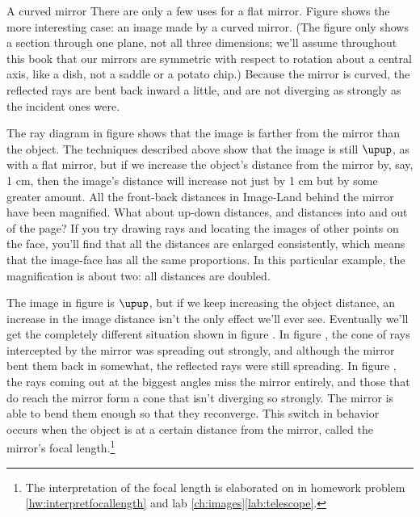 \begin{envsubsection}{A curved mirror}
There are only a few uses for a flat mirror. Figure  shows
the more interesting case: an image made by a curved mirror. (The figure only shows a section through
one plane, not all three dimensions; we'll assume throughout this book that our mirrors are
symmetric with respect to rotation about a central axis, like a dish, not a saddle or a potato chip.)
Because the mirror is curved, the reflected rays are bent back inward a little, and are not
diverging as strongly as the incident ones were.

%
The ray diagram in figure  shows that the image is farther from
the mirror than the object. The techniques described above show that the image is
still $\upup$, as with a flat mirror, but if we increase the object's distance from the
mirror by, say, 1 cm, then the image's distance will increase not just by 1 cm but by
some greater amount. All the front-back distances in Image-Land behind the mirror
have been magnified. What about up-down distances, and distances into and out of the page?
If you try drawing rays and locating the images of other points on the face, you'll find that
all the distances are enlarged consistently, which means that the image-face has all the same
proportions. In this particular example, the magnification is about two: all distances are
doubled.
\end{envsubsection}
%
\vfill
%
The image in figure  is $\upup$, but if we keep increasing
the object distance, an increase in the image distance isn't the only effect we'll ever see.
Eventually we'll get the completely different situation shown in figure . 
In figure , the cone of rays intercepted by the mirror was spreading
out strongly, and although the mirror bent them back in somewhat, the reflected rays were still spreading.
In figure , the rays coming out at the biggest angles miss the mirror
entirely, and those that do reach the mirror form a cone that isn't diverging so
strongly. The mirror is able to bend them enough so that they reconverge.
This switch in behavior occurs when the object is at a certain distance from the mirror,
called the mirror's focal\label{focal-length-definition}
length.\footnote{The interpretation of the focal length is elaborated on in
homework problem \ref{hw:interpretfocallength} and lab \ref{ch:images}\ref{lab:telescope}.}

